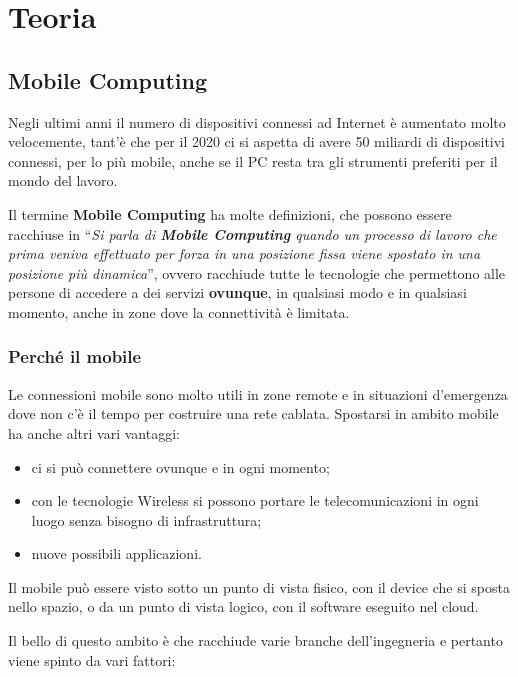 \part{Teoria}

\chapter{Mobile Computing}
\label{mobile-computing}

Negli ultimi anni il numero di dispositivi connessi ad Internet è
aumentato molto velocemente, tant'è che per il 2020 ci si aspetta di
avere 50 miliardi di dispositivi connessi, per lo più mobile, anche se
il PC resta tra gli strumenti preferiti per il mondo del lavoro.

Il termine \textbf{Mobile Computing} ha molte definizioni, che possono
essere racchiuse in ``\emph{Si parla di \textbf{Mobile Computing} quando
un processo di lavoro che prima veniva effettuato per forza in una
posizione fissa viene spostato in una posizione più dinamica}'', ovvero
racchiude tutte le tecnologie che permettono alle persone di accedere a
dei servizi \textbf{ovunque}, in qualsiasi modo e in qualsiasi momento, anche
in zone dove la connettività è limitata.

\section{Perché il mobile}

Le connessioni mobile sono molto utili in zone remote e in situazioni 
d'emergenza dove non c'è il tempo per costruire una rete cablata.
Spostarsi in ambito mobile ha anche altri vari vantaggi:

\begin{itemize}
\item ci si può connettere ovunque e in ogni momento;
\item con le tecnologie Wireless si possono portare le telecomunicazioni in
  ogni luogo senza bisogno di infrastruttura;
\item nuove possibili applicazioni.
\end{itemize}

Il mobile può essere visto sotto un punto di vista fisico, con il
device che si sposta nello spazio, o da un punto di vista logico, con il
software eseguito nel cloud.

Il bello di questo ambito è che racchiude varie branche dell'ingegneria
e pertanto viene spinto da vari fattori:

